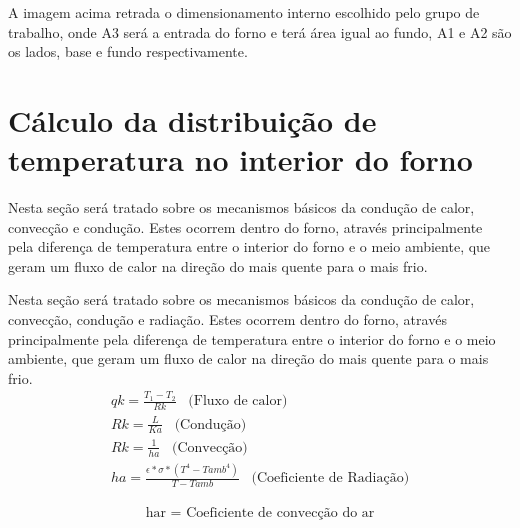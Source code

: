 A imagem acima retrada o dimensionamento interno escolhido pelo grupo de trabalho, onde A3 será a entrada do forno e terá área igual ao fundo, A1 e A2 são os lados, base e fundo respectivamente.

\section{Cálculo da distribuição de temperatura no interior do forno}
Nesta seção será tratado sobre os mecanismos básicos da condução de calor, convecção e condução. Estes ocorrem dentro do forno, através principalmente pela diferença de temperatura entre o interior do forno e o meio ambiente, que geram um fluxo de calor na direção do mais quente para o mais frio.

Nesta seção será tratado sobre os mecanismos básicos da condução de calor, convecção, condução e radiação. Estes ocorrem dentro do forno, através principalmente pela diferença de temperatura entre o interior do forno e o meio ambiente, que geram um fluxo de calor na direção do mais quente para o mais frio.
\begin{gather}
	qk = \frac{T_1 - T_2}{Rk} \hspace{10pt} \text{(Fluxo de calor)} \\
	Rk = \frac{L}{Ka} \hspace{10pt} \text{(Condu\c{c}\~ao)} \\
	Rk = \frac{1}{ha} \hspace{10pt} \text{(Convec\c{c}\~ao)} \\
	ha = \frac{\epsilon * \sigma *(T^{4}-Tamb^{4})}{T - Tamb} \hspace{10pt} \text{(Coeficiente de Radia\c{c}\~ao)}
\end{gather}

\begin{gather}
    \text{har = Coeficiente de convec\c{c}\~ao do ar} \nonumber
\end{gather}

